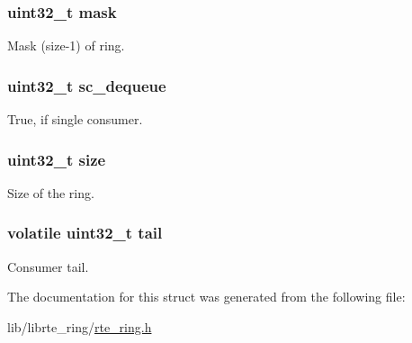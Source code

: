 \subsubsection[{mask}]{\setlength{\rightskip}{0pt plus 5cm}uint32\+\_\+t mask}\label{structrte__ring_1_1cons_ad3bee21df6875eeccd25d3c577e0600a}
Mask (size-\/1) of ring. \hypertarget{structrte__ring_1_1cons_af26638b0c5eea5e1e3f58305293a1c51}{}
\subsubsection[{sc\+\_\+dequeue}]{\setlength{\rightskip}{0pt plus 5cm}uint32\+\_\+t sc\+\_\+dequeue}\label{structrte__ring_1_1cons_af26638b0c5eea5e1e3f58305293a1c51}
True, if single consumer. \hypertarget{structrte__ring_1_1cons_ab2c6b258f02add8fdf4cfc7c371dd772}{}
\subsubsection[{size}]{\setlength{\rightskip}{0pt plus 5cm}uint32\+\_\+t size}\label{structrte__ring_1_1cons_ab2c6b258f02add8fdf4cfc7c371dd772}
Size of the ring. \hypertarget{structrte__ring_1_1cons_ac053cdb6967e8901ed4c87327d649bf7}{}
\subsubsection[{tail}]{\setlength{\rightskip}{0pt plus 5cm}volatile uint32\+\_\+t tail}\label{structrte__ring_1_1cons_ac053cdb6967e8901ed4c87327d649bf7}
Consumer tail. 

The documentation for this struct was generated from the following file\+:\begin{DoxyCompactItemize}
\item 
lib/librte\+\_\+ring/\hyperlink{rte__ring_8h}{rte\+\_\+ring.\+h}\end{DoxyCompactItemize}
